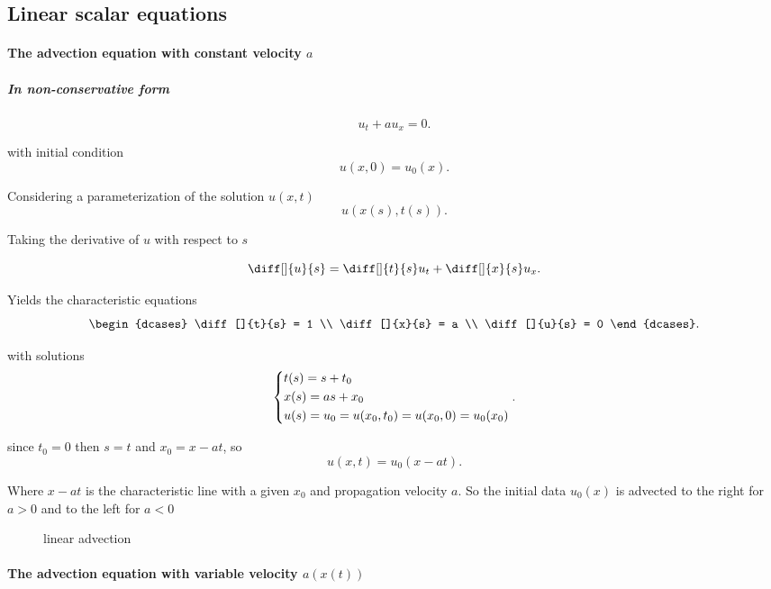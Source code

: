 
\subsectionfont{\fontsize{10}{10}\selectfont}

\subsection{Linear scalar equations}%
\paragraph{The advection equation with constant velocity $a$}
\subparagraph{In non-conservative form}
\[
u_{t}+au_{x} = 0
.\] 

with initial condition
\[
  u(x,0) = u_{0}(x)
.\] 

Considering a parameterization of the solution $u(x,t)$
 \[
   u(x(s),t(s))
.\] 

Taking the derivative of $u$ with respect to $s$ 

\[
  \diff[]{u}{s} = \diff[]{t}{s}u_{t} + \diff[]{x}{s}u_{x}
.\] 

Yields the characteristic equations
\[
\begin{dcases}
  \diff[]{t}{s} = 1 \\
  \diff[]{x}{s} = a \\
  \diff[]{u}{s} = 0 
\end{dcases}
.\] 

with solutions
\[
\begin{dcases}
  t(s) = s + t_0 \\
  x(s) = as + x_0 \\
  u(s) = u_0 = u(x_0,t_0) = u(x_{0},0) = u_{0}(x_{0})
\end{dcases}
.\] 

since $t_0=0$ then $s=t$ and $x_0 = x - at$, so 
\[
  \boxed{u(x,t) = u_0(x-at)}
.\] 

Where $x-at$ is the characteristic line with a given $x_0$ and propagation
velocity $a$. So the initial data $u_0(x)$ is advected to the right for $a>0$
and to the left for $a<0$

\begin{figure}[ht]
    \centering
    \caption{linear advection}
    \label{fig:linear-advection}
\end{figure}


\paragraph{The advection equation with variable velocity $a(x(t))$}

